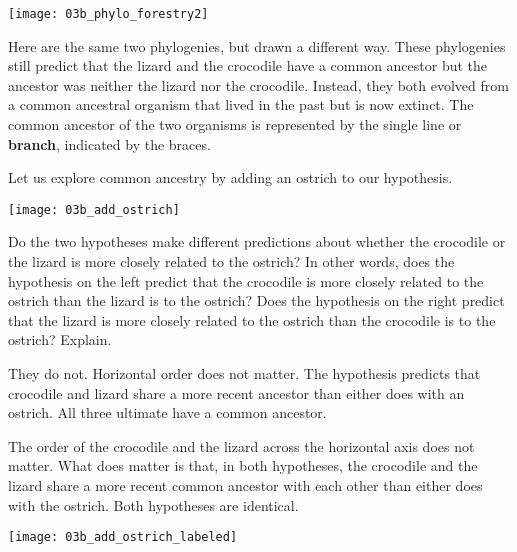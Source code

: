 \documentclass[12pt, hidelinks]{exam}
\newcommand*\AnswerBox[2]{%
    \parbox[t][#1]{0.92\textwidth}{%
    \begin{solution}#2\end{solution}}
}
\begin{document}

\begin{center}%

	\noindent\texttt{[image: 03b\_phylo\_forestry2]}
\end{center}

Here are the same two phylogenies, but drawn a different way. These
phylogenies still predict that the lizard and the crocodile have a
common ancestor but the ancestor was neither the lizard nor the
crocodile. Instead, they both evolved from a common ancestral organism
that lived in the past but is now extinct. The common ancestor of the
two organisms is represented by the single line or \textbf{branch}, indicated
 by the braces.

Let us explore common ancestry by adding an ostrich to our hypothesis.


\begin{center}
	\noindent\texttt{[image: 03b\_add\_ostrich]}
\end{center}

\begin{questions}
\setcounter{question}{2}

\question
Do the two hypotheses make different predictions about
whether the crocodile or the lizard is more closely related to the
ostrich? In other words, does the hypothesis on the left predict that
the crocodile is more closely related to the ostrich than the lizard is
to the ostrich? Does the hypothesis on the right predict that the lizard
is more closely related to the ostrich than the crocodile is to the
ostrich? Explain.

\AnswerBox{5\baselineskip}{They do not. Horizontal order does not
matter. The hypothesis predicts that crocodile and lizard share a more
recent ancestor than either does with an ostrich. All three ultimate have
a common ancestor.}

\end{questions}

The order of the crocodile and the lizard across the horizontal axis
does not matter. What does matter is that, in both hypotheses, the
crocodile and the lizard share a more recent common ancestor with each
other than either does with the ostrich. Both hypotheses are identical.

\begin{center}
	\noindent\texttt{[image: 03b\_add\_ostrich\_labeled]}
\end{center}
\end{document}
